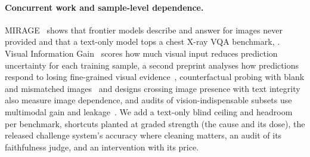 \paragraph{Concurrent work and sample-level dependence.}
MIRAGE~\cite{asadi2026mirage} shows that frontier models describe and answer for images never provided and that a text-only model tops a chest X-ray VQA benchmark, .
Visual Information Gain~\cite{lee2026vig} scores how much visual input reduces prediction uncertainty for each training sample, a second preprint analyses how predictions respond to losing fine-grained visual evidence~\cite{lan2026seeing}, counterfactual probing with blank and mismatched images~\cite{zhu2026ask4vg} and designs crossing image presence with text integrity~\cite{senoglu2026sure} also measure image dependence, and audits of vision-indispensable subsets use multimodal gain and leakage~\cite{chen2024mmstar}.
We add a text-only blind ceiling and headroom per benchmark, shortcuts planted at graded strength (the cause and its dose), the released challenge system's accuracy where cleaning matters, an audit of its faithfulness judge, and an intervention with its price.
